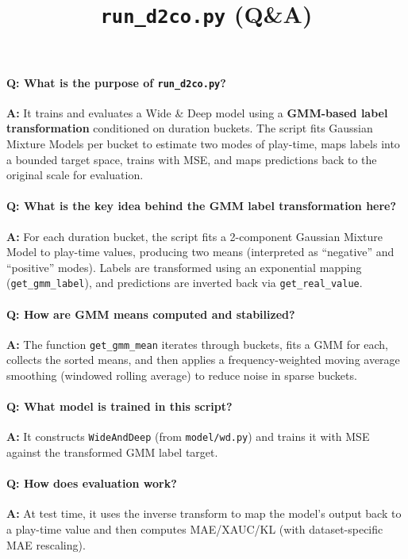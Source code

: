 \documentclass[11pt]{article}
\title{\texttt{run\_d2co.py} (Q\&A)}
\author{}
\date{}
\begin{document}
\maketitle

\paragraph{Q: What is the purpose of \texttt{run\_d2co.py}?}
\textbf{A:} It trains and evaluates a Wide \& Deep model using a \textbf{GMM-based label transformation} conditioned on duration buckets. The script fits Gaussian Mixture Models per bucket to estimate two modes of play-time, maps labels into a bounded target space, trains with MSE, and maps predictions back to the original scale for evaluation.

\paragraph{Q: What is the key idea behind the GMM label transformation here?}
\textbf{A:} For each duration bucket, the script fits a 2-component Gaussian Mixture Model to play-time values, producing two means (interpreted as ``negative'' and ``positive'' modes). Labels are transformed using an exponential mapping (\lstinline|get_gmm_label|), and predictions are inverted back via \lstinline|get_real_value|.

\paragraph{Q: How are GMM means computed and stabilized?}
\textbf{A:} The function \lstinline|get_gmm_mean| iterates through buckets, fits a GMM for each, collects the sorted means, and then applies a frequency-weighted moving average smoothing (windowed rolling average) to reduce noise in sparse buckets.

\paragraph{Q: What model is trained in this script?}
\textbf{A:} It constructs \lstinline|WideAndDeep| (from \lstinline|model/wd.py|) and trains it with MSE against the transformed GMM label target.

\paragraph{Q: How does evaluation work?}
\textbf{A:} At test time, it uses the inverse transform to map the model's output back to a play-time value and then computes MAE/XAUC/KL (with dataset-specific MAE rescaling).
\end{document}
